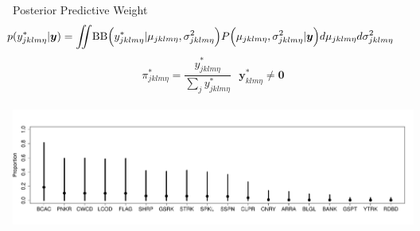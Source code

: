 \documentclass[ xcolor = pdftex, dvipsnames, table ]{beamer}
\begin{document}
\subsection{}
\begin{frame}{Posterior Predictive Weight}
\vspace{-0.5cm}
\begin{equation*}
\hspace{-0.8cm}
p(y^*_{jklm\eta}|\bm{y}) = \int\!\!\!\!\int\! \text{BB}\Big( y^*_{jklm\eta}|\mu_{jklm\eta}, \sigma^2_{jklm\eta} \Big) P\Big(\mu_{jklm\eta}, \sigma^2_{jklm\eta} | \bm{y}\Big) d\mu_{jklm\eta} d\sigma^2_{jklm\eta}
\end{equation*}
\begin{equation*}
\pi^*_{jklm\eta} = \frac{y^*_{jklm\eta}}{\sum_j y^*_{jklm\eta}} ~~~ \bm{y}^*_{klm\eta}\neq \bm{0}
\end{equation*}
%
\color{red}{Update Picture}\\
\includegraphics[width=1.15\textwidth]{../pictures/bocBox1.pdf}
\end{frame}

%

%
%
\end{document}
